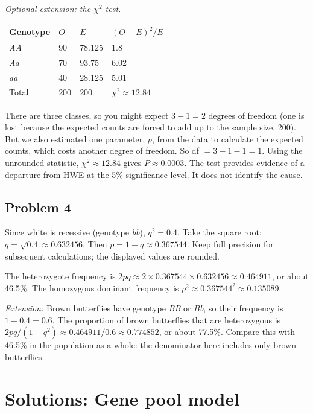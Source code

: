 \documentclass[
  a4paper]{book}
\newcounter{none} %
\begin{document}
\emph{Optional extension: the \(\chi^2\) test.}

{\def\LTcaptype{none} %
\begin{longtable}[]{@{}llll@{}}
\toprule\noalign{}
Genotype & \(O\) & \(E\) & \((O - E)^2/E\) \\
\midrule\noalign{}
\endhead
\bottomrule\noalign{}
\endlastfoot
\emph{AA} & 90 & 78.125 & 1.8 \\
\emph{Aa} & 70 & 93.75 & 6.02 \\
\emph{aa} & 40 & 28.125 & 5.01 \\
Total & 200 & 200 & \(\chi^2 \approx 12.84\) \\
\end{longtable}
}

There are three classes, so you might expect \(3 - 1 = 2\) degrees of freedom (one is lost because the expected counts are forced to add up to the sample size, 200). But we also estimated one parameter, \(p\), from the data to calculate the expected counts, which costs another degree of freedom. So df \(= 3 - 1 - 1 = 1\). Using the unrounded statistic, \(\chi^2 \approx 12.84\) gives \(P \approx 0.0003\). The test provides evidence of a departure from HWE at the 5\% significance level. It does not identify the cause.

\subsection{Problem 4}\label{problem-4}

Since white is recessive (genotype \emph{bb}), \(q^2 = 0.4\). Take the square root: \(q = \sqrt{0.4} \approx 0.632456\). Then \(p = 1 - q \approx 0.367544\). Keep full precision for subsequent calculations; the displayed values are rounded.

The heterozygote frequency is \(2pq \approx 2 \times 0.367544 \times 0.632456 \approx 0.464911\), or about 46.5\%. The homozygous dominant frequency is \(p^2 \approx 0.367544^2 \approx 0.135089\).

\emph{Extension:} Brown butterflies have genotype \emph{BB} or \emph{Bb}, so their frequency is \(1 - 0.4 = 0.6\). The proportion of brown butterflies that are heterozygous is \(2pq / (1 - q^2) \approx 0.464911 / 0.6 \approx 0.774852\), or about 77.5\%. Compare this with 46.5\% in the population as a whole: the denominator here includes only brown butterflies.

\section{Solutions: Gene pool model}\label{solutions-gene-pool-model}
\end{document}
